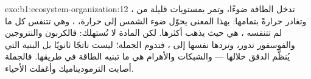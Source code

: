\begin{solution}{exo:b1:ecosystem-organization:12}
تدخل الطاقة ضوءًا، وتمر بمستويات قليلة من ، وتغادر حرارةً
بتمامها:  بهذا المعنى يحوّل ضوء الشمس إلى حرارة،
، وهي تتنفس كل ما لم تتنفسه ، هي حيث يذهب
أكثرها. لكن المادة لا تُستهلك: فالكربون والنتروجين والفوسفور تدور،
وتردها  نفسها إلى ، فتدوم الجملة؛ 
ليست ناتجًا ثانويًا بل البنية التي يُنظَّم الدفق خلالها --- 
والشبكات والأهرام هي ما تبنيه الطاقة في طريقها. فالجملة أصابت
الترموديناميك وأغفلت الأحياء.
\end{solution}

